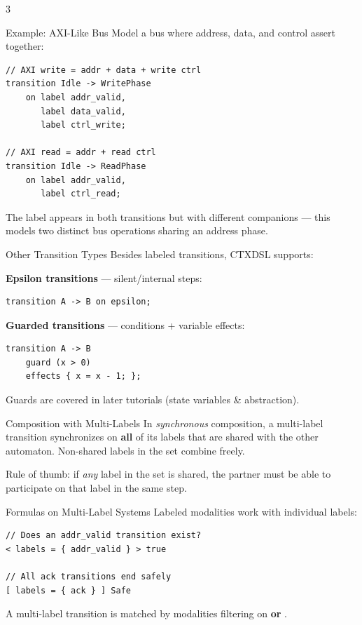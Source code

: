\begin{multicols}{3}
\begin{tipbox}{Example: AXI-Like Bus}
Model a bus where address, data, and control assert together:
\begin{lstlisting}[style=ctxdsl]
// AXI write = addr + data + write ctrl
transition Idle -> WritePhase
    on label addr_valid,
       label data_valid,
       label ctrl_write;

// AXI read = addr + read ctrl
transition Idle -> ReadPhase
    on label addr_valid,
       label ctrl_read;
\end{lstlisting}
The label  appears in both transitions but with different companions --- this models two distinct bus operations sharing an address phase.
\end{tipbox}


\begin{cheatbox}{Other Transition Types}
Besides labeled transitions, CTXDSL supports:

\smallskip
\textbf{Epsilon transitions} --- silent/internal steps:
\begin{lstlisting}[style=ctxdsl]
transition A -> B on epsilon;
\end{lstlisting}

\smallskip
\textbf{Guarded transitions} --- conditions + variable effects:
\begin{lstlisting}[style=ctxdsl]
transition A -> B
    guard (x > 0)
    effects { x = x - 1; };
\end{lstlisting}
Guards are covered in later tutorials (state variables \& abstraction).
\end{cheatbox}

\begin{tipbox}{Composition with Multi-Labels}
In \emph{synchronous} composition, a multi-label transition synchronizes on \textbf{all} of its labels that are shared with the other automaton.  Non-shared labels in the set combine freely.

\smallskip
Rule of thumb: if \emph{any} label in the set is shared, the partner must be able to participate on that label in the same step.
\end{tipbox}

\begin{cheatbox}{Formulas on Multi-Label Systems}
Labeled modalities work with individual labels:
\begin{lstlisting}[style=ctxdsl]
// Does an addr_valid transition exist?
< labels = { addr_valid } > true

// All ack transitions end safely
[ labels = { ack } ] Safe
\end{lstlisting}
A multi-label transition  is matched by modalities filtering on  \textbf{or} .
\end{cheatbox}

\end{multicols}

